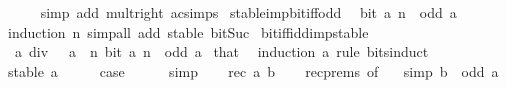 \begin{isabellebody}
\ \ \ \ \isamarkupfalse%
\ {\isacharparenleft}{\kern0pt}simp\ add{\isacharcolon}{\kern0pt}\ mult{\isacharunderscore}{\kern0pt}{}{\isacharunderscore}{\kern0pt}right\ ac{\isacharunderscore}{\kern0pt}simps{\isacharparenright}{\kern0pt}\isanewline
{}\isamarkupfalse%
%
\endisatagproof
{\isafoldproof}%
%
\isadelimproof
\isanewline
%
\endisadelimproof
\isanewline
{}\isamarkupfalse%
\ stable{\isacharunderscore}{\kern0pt}imp{\isacharunderscore}{\kern0pt}bit{\isacharunderscore}{\kern0pt}iff{\isacharunderscore}{\kern0pt}odd{\isacharcolon}{\kern0pt}\isanewline
\ \ {\isacartoucheopen}bit\ a\ n\ {\isasymlongleftrightarrow}\ odd\ a{\isacartoucheclose}\isanewline
%
\isadelimproof
\ \ %
\endisadelimproof
%
\isatagproof
{}\isamarkupfalse%
\ {\isacharparenleft}{\kern0pt}induction\ n{\isacharparenright}{\kern0pt}\ {\isacharparenleft}{\kern0pt}simp{\isacharunderscore}{\kern0pt}all\ add{\isacharcolon}{\kern0pt}\ stable\ bit{\isacharunderscore}{\kern0pt}Suc{\isacharparenright}{\kern0pt}%
\endisatagproof
{\isafoldproof}%
%
\isadelimproof
\isanewline
%
\endisadelimproof
\isanewline
{}\isamarkupfalse%
\isanewline
\isanewline
{}\isamarkupfalse%
\ bit{\isacharunderscore}{\kern0pt}iff{\isacharunderscore}{\kern0pt}idd{\isacharunderscore}{\kern0pt}imp{\isacharunderscore}{\kern0pt}stable{\isacharcolon}{\kern0pt}\isanewline
\ \ {\isacartoucheopen}a\ div\ {}\ {\isacharequal}{\kern0pt}\ a{\isacartoucheclose}\ \ {\isacartoucheopen}{\isasymAnd}n{\isachardot}{\kern0pt}\ bit\ a\ n\ {\isasymlongleftrightarrow}\ odd\ a{\isacartoucheclose}\isanewline
%
\isadelimproof
%
\endisadelimproof
%
\isatagproof
{}\isamarkupfalse%
\ that\ \isamarkupfalse%
\ {\isacharparenleft}{\kern0pt}induction\ a\ rule{\isacharcolon}{\kern0pt}\ bits{\isacharunderscore}{\kern0pt}induct{\isacharparenright}{\kern0pt}\isanewline
\ \ \isamarkupfalse%
\ {\isacharparenleft}{\kern0pt}stable\ a{\isacharparenright}{\kern0pt}\isanewline
\ \ \isamarkupfalse%
\ \isamarkupfalse%
\ {\isacharquery}{\kern0pt}case\isanewline
\ \ \ \ \isamarkupfalse%
\ simp\isanewline
{}\isamarkupfalse%
\isanewline
\ \ \isamarkupfalse%
\ {\isacharparenleft}{\kern0pt}rec\ a\ b{\isacharparenright}{\kern0pt}\isanewline
\ \ \isamarkupfalse%
\ rec{\isachardot}{\kern0pt}prems\ {\isacharbrackleft}{\kern0pt}of\ {}{\isacharbrackright}{\kern0pt}\ \isamarkupfalse%
\ {\isacharbrackleft}{\kern0pt}simp{\isacharbrackright}{\kern0pt}{\isacharcolon}{\kern0pt}\ {\isacartoucheopen}b\ {\isacharequal}{\kern0pt}\ odd\ a{\isacartoucheclose}\isanewline

\end{isabellebody}
